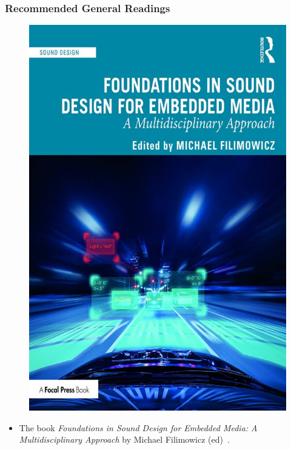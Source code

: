 \documentclass[screen, aspectratio=169]{beamer}
\begin{document}
\begin{frame}
\frametitle{Recommended General Readings}
\begin{figure}
\includegraphics[scale=0.15]{img/Routledge-embedded-media.jpg}
\end{figure}
\begin{itemize}
\item The book \emph{Foundations in Sound Design for Embedded Media: A Multidisciplinary Approach} by Michael Filimowicz (ed)~\cite{Filimowicz.2019}.
\end{itemize}
\end{frame}
%
\end{document}
